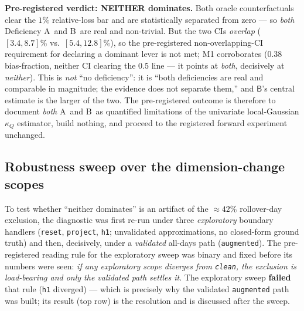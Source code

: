 \documentclass[11pt]{article}
\newcommand{\kQ}{\kappa_{Q}}
\newcommand{\defA}{\textsf{A}}
\newcommand{\defB}{\textsf{B}}
\begin{document}
\noindent\textbf{Pre-registered verdict: NEITHER dominates.} Both
oracle counterfactuals clear the $1\%$ relative-loss bar and are
statistically separated from zero --- so \emph{both} Deficiency \defA\
and \defB\ are real and non-trivial. But the two CIs \emph{overlap}
($[3.4,8.7]\%$ vs.\ $[5.4,12.8]\%$), so the pre-registered
non-overlapping-CI requirement for declaring a dominant lever is not
met; M1 corroborates ($0.38$ bias-fraction, neither CI clearing the
$0.5$ line --- it points at \emph{both}, decisively at \emph{neither}).
This is \emph{not} ``no deficiency'': it is ``both deficiencies are
real and comparable in magnitude; the evidence does not separate them,''
and $\defB$'s central estimate is the larger of the two. The
pre-registered outcome is therefore to document \emph{both} \defA\ and
\defB\ as quantified limitations of the univariate local-Gaussian
$\kQ$ estimator, build nothing, and proceed to the registered forward
experiment unchanged.

\subsection{Robustness sweep over the dimension-change scopes}

To test whether ``neither dominates'' is an artifact of the
${\approx}42\%$ rollover-day exclusion, the diagnostic was first re-run
under three \emph{exploratory} boundary handlers (\texttt{reset},
\texttt{project}, \texttt{h1}; unvalidated approximations, no
closed-form ground truth) and then, decisively, under a \emph{validated}
all-days path (\texttt{augmented}). The pre-registered reading rule for
the exploratory sweep was binary and fixed before its numbers were
seen: \emph{if any exploratory scope diverges from \texttt{clean}, the
exclusion is load-bearing and only the validated path settles it}. The
exploratory sweep \textbf{failed} that rule (\texttt{h1} diverged) ---
which is precisely why the validated \texttt{augmented} path was built;
its result (top row) is the resolution and is discussed after the
sweep.
\end{document}
